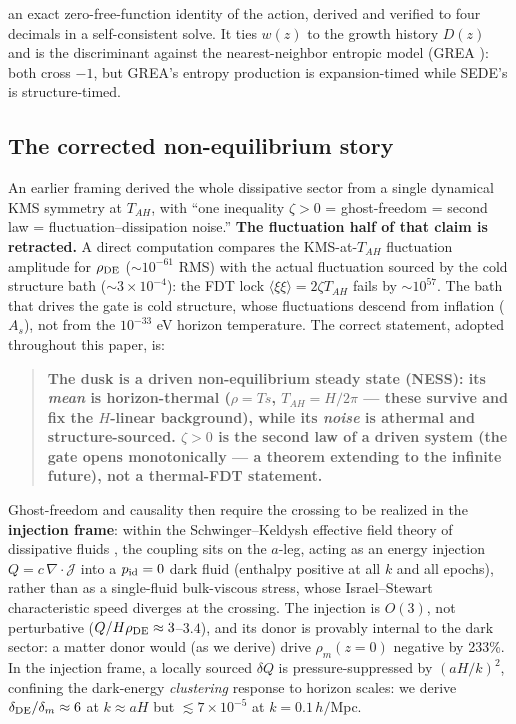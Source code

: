 \documentclass[submission, Phys]{SciPost}
\begin{document}
an exact zero-free-function identity of the action, derived and verified
to four decimals in a self-consistent solve. It ties \(w(z)\) to the
growth history \(D(z)\) and is the discriminant against the
nearest-neighbor entropic model (GREA \cite{Garcia-Bellido:2024qau}):
both cross \(-1\), but GREA's entropy production is expansion-timed
while SEDE's is structure-timed.

\subsection{The corrected non-equilibrium story}\label{sec-2-2}

An earlier framing derived the whole dissipative sector from a single
dynamical KMS symmetry at \(T_{AH}\), with ``one inequality
\(\zeta > 0\) = ghost-freedom = second law = fluctuation--dissipation
noise.'' \textbf{The fluctuation half of that claim is retracted.} A
direct computation compares the KMS-at-\(T_{AH}\) fluctuation amplitude
for \(\rho_{\rm DE}\) (\(\sim 10^{-61}\) RMS) with the actual
fluctuation sourced by the cold structure bath
(\(\sim 3\times 10^{-4}\)): the FDT lock
\(\langle\xi\xi\rangle = 2\zeta T_{AH}\) fails by \(\sim 10^{57}\). The
bath that drives the gate is cold structure, whose fluctuations descend
from inflation (\(A_s\)), not from the \(10^{-33}\) eV horizon
temperature. The correct statement, adopted throughout this paper, is:

\begin{quote}
\textbf{The dusk is a driven non-equilibrium steady state (NESS): its
\emph{mean} is horizon-thermal (\(\rho = Ts\), \(T_{AH} = H/2\pi\) ---
these survive and fix the \(H\)-linear background), while its
\emph{noise} is athermal and structure-sourced. \(\zeta > 0\) is the
second law of a driven system (the gate opens monotonically --- a
theorem extending to the infinite future), not a thermal-FDT statement.}
\end{quote}

Ghost-freedom and causality then require the crossing to be realized in
the \textbf{injection frame}: within the Schwinger--Keldysh effective
field theory of dissipative fluids \cite{Crossley:2015evo}, the
coupling sits on the \(a\)-leg, acting as an energy injection
\(Q = c\,\nabla\!\cdot\!\mathcal{J}\) into a \(p_{\rm id} = 0\) dark
fluid (enthalpy positive at all \(k\) and all epochs), rather than as a
single-fluid bulk-viscous stress, whose Israel--Stewart characteristic
speed diverges at the crossing. The injection is \(O(3)\), not
perturbative (\(Q/H\rho_{\rm DE}\approx 3\)--\(3.4\)), and its donor is
provably internal to the dark sector: a matter donor would (as we
derive) drive \(\rho_m(z{=}0)\) negative by 233\%. In the injection
frame, a locally sourced \(\delta Q\) is pressure-suppressed by
\((aH/k)^2\), confining the dark-energy \emph{clustering} response to
horizon scales: we derive \(\delta_{\rm DE}/\delta_m \approx 6\) at
\(k\approx aH\) but \(\lesssim 7\times 10^{-5}\) at \(k = 0.1\,h/\)Mpc.
\end{document}
